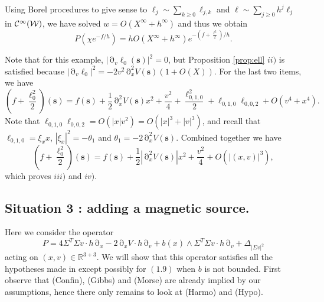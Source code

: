 \documentclass[12pt]{amsart}
\newcommand{\R}{\mathbb R}
\numberwithin{equation}{section}
\numberwithin{figure}{section}
\def\s{\mathbf{s}}
\DeclareMathOperator{\p}{\partial}
\begin{document}
Using Borel procedures to give sense to $\ell_j\sim\sum_{k\geq0}\ell_{j,k}$ and $\ell\sim\sum_{j\geq0}h^j\ell_j$ in ${\mathcal C}^\infty({\mathcal W})$, we have solved $w = O(X^\infty + h^\infty)$ and thus we obtain
\begin{equation*}
P(\chi e^{-f/h}) = hO(X^\infty + h^\infty)e^{-(f+\frac{\ell^2}{2})/h}.
\end{equation*}

Note that for this example, $|\p_v\ell_0(\s)|^2 = 0$, but Proposition \ref{prop:ell} $ii)$ is satisfied because $|\p_v\ell_0|^2 = - 2v^2\p_x^2V(\s)(1+O(X))$. For the last two items, we have
\begin{equation*}
(f+\frac{\ell_0^2}{2})(\s) = f(\s) + \frac12\p_x^2V(\s)x^2 + \frac{v^2}{4} + \frac{\ell_{0,1,0}^2}{2} + \ell_{0,1,0}\ell_{0,0,2} + O(v^4 + x^4).
\end{equation*}
Note that $\ell_{0,1,0}\ell_{0,0,2} = O(|x|v^2) = O(|x|^3 + |v|^3)$, and recall that $\ell_{0,1,0} = \xi_xx$, $|\xi_x|^2 = -\theta_1$ and $\theta_1 = -2\p_x^2V(\s)$. Combined together we have
\begin{equation*}
(f+\frac{\ell_0^2}{2})(\s) = f(\s) + \frac12|\p_x^2V(\s)|x^2 + \frac{v^2}{4} + O(|(x,v)|^3),
\end{equation*}
which proves $iii)$ and $iv)$.










\subsection{Situation 3 : adding a magnetic source.}

Here we consider the operator
\begin{equation*}
P = 4\Sigma^T\Sigma v\cdot h\p_x - 2\p_xV\cdot h\p_v + b(x)\wedge \Sigma^T\Sigma v\cdot h\p_v + \Delta_{|\Sigma v|^2}
\end{equation*}
acting on $(x,v)\in\R^{3+3}$. We will show that this operator satisfies all the hypotheses made in \cite{BoLePMi22} except possibly for $(1.9)$ when $b$ is not bounded. First observe that (Confin), (Gibbs) and (Morse) are already implied by our assumptions, hence there only remains to look at (Harmo) and (Hypo).
\end{document}
